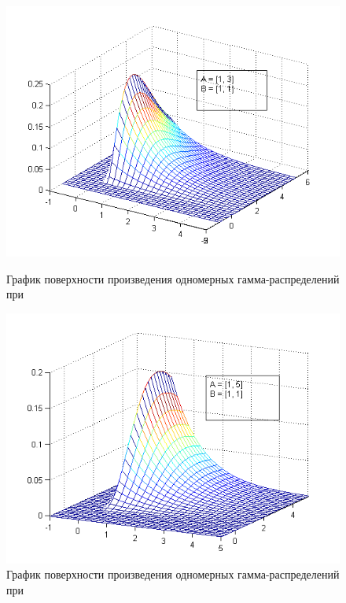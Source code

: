 \newpage

\begin{figure}[h]
  \begin{minipage}[h]{0.49\linewidth}
    \includegraphics[width=1\linewidth]{../pic/new/gamma_mesh_5}
    \caption{График поверхности произведения одномерных гамма-распределений при }
  \end{minipage}
  \hfill
  \begin{minipage}[h]{0.49\linewidth}
    \vspace{4mm}
    \includegraphics[width=1\linewidth]{../pic/new/gamma_mesh_6}
    \caption{График поверхности произведения одномерных гамма-распределений при}
  \end{minipage}
\end{figure}

